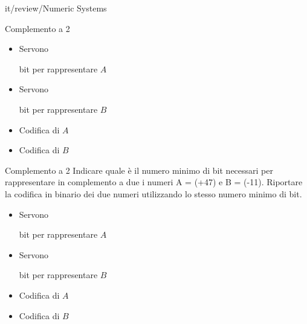 \documentclass[11pt]{article}
\begin{document}
\begin{quiz}{it/review/Numeric Systems}
\begin{cloze}[points=1,shuffle=false]{Complemento a 2}
\begin{itemize}
\item Servono  bit per rappresentare $A$
\item Servono  bit per rappresentare $B$
\item Codifica di $A$ 
\item Codifica di $B$ 
\end{itemize}
\end{cloze}

\begin{cloze}[points=1,shuffle=false]{Complemento a 2}
Indicare quale \`{e} il numero minimo di bit necessari per rappresentare in complemento a due i numeri A = (+47) e B = (-11). Riportare la codifica in binario dei due numeri utilizzando lo stesso numero minimo di bit.

\begin{itemize}
\item Servono  bit per rappresentare $A$
\item Servono  bit per rappresentare $B$
\item Codifica di $A$ 
\item Codifica di $B$ 
\end{itemize}
\end{cloze}


\end{quiz}
\end{document}
